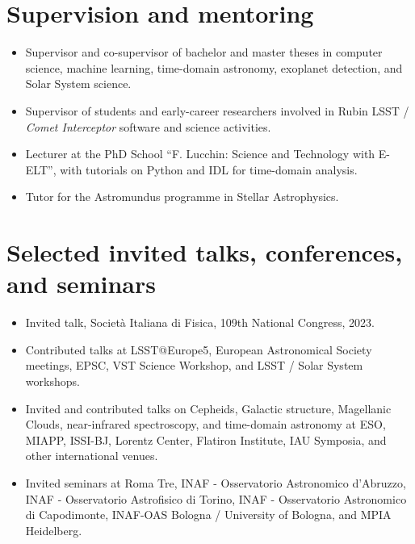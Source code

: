 \documentclass[11pt,a4paper]{article}
\begin{document}
\section*{Supervision and mentoring}
\begin{itemize}
    \item Supervisor and co-supervisor of bachelor and master theses in computer science, machine learning, time-domain astronomy, exoplanet detection, and Solar System science.
    \item Supervisor of students and early-career researchers involved in Rubin LSST / \textit{Comet Interceptor} software and science activities.
    \item Lecturer at the PhD School ``F. Lucchin: Science and Technology with E-ELT'', with tutorials on Python and IDL for time-domain analysis.
    \item Tutor for the Astromundus programme in Stellar Astrophysics.
\end{itemize}

\section*{Selected invited talks, conferences, and seminars}
\begin{itemize}
    \item Invited talk, Societ\`a Italiana di Fisica, 109th National Congress, 2023.
    \item Contributed talks at LSST@Europe5, European Astronomical Society meetings, EPSC, VST Science Workshop, and LSST / Solar System workshops.
    \item Invited and contributed talks on Cepheids, Galactic structure, Magellanic Clouds, near-infrared spectroscopy, and time-domain astronomy at ESO, MIAPP, ISSI-BJ, Lorentz Center, Flatiron Institute, IAU Symposia, and other international venues.
    \item Invited seminars at Roma Tre, INAF - Osservatorio Astronomico d'Abruzzo, INAF - Osservatorio Astrofisico di Torino, INAF - Osservatorio Astronomico di Capodimonte, INAF-OAS Bologna / University of Bologna, and MPIA Heidelberg.
\end{itemize}
\end{document}
